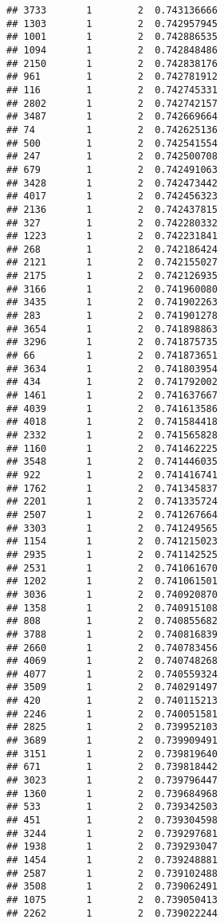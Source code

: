 \documentclass[
]{article}
\begin{document}
\begin{verbatim}
## 3733       1        2  0.743136666
## 1303       1        2  0.742957945
## 1001       1        2  0.742886535
## 1094       1        2  0.742848486
## 2150       1        2  0.742838176
## 961        1        2  0.742781912
## 116        1        2  0.742745331
## 2802       1        2  0.742742157
## 3487       1        2  0.742669664
## 74         1        2  0.742625136
## 500        1        2  0.742541554
## 247        1        2  0.742500708
## 679        1        2  0.742491063
## 3428       1        2  0.742473442
## 4017       1        2  0.742456323
## 2136       1        2  0.742437815
## 327        1        2  0.742280332
## 1223       1        2  0.742231841
## 268        1        2  0.742186424
## 2121       1        2  0.742155027
## 2175       1        2  0.742126935
## 3166       1        2  0.741960080
## 3435       1        2  0.741902263
## 283        1        2  0.741901278
## 3654       1        2  0.741898863
## 3296       1        2  0.741875735
## 66         1        2  0.741873651
## 3634       1        2  0.741803954
## 434        1        2  0.741792002
## 1461       1        2  0.741637667
## 4039       1        2  0.741613586
## 4018       1        2  0.741584418
## 2332       1        2  0.741565828
## 1160       1        2  0.741462225
## 3548       1        2  0.741446035
## 922        1        2  0.741416741
## 1762       1        2  0.741345837
## 2201       1        2  0.741335724
## 2507       1        2  0.741267664
## 3303       1        2  0.741249565
## 1154       1        2  0.741215023
## 2935       1        2  0.741142525
## 2531       1        2  0.741061670
## 1202       1        2  0.741061501
## 3036       1        2  0.740920870
## 1358       1        2  0.740915108
## 808        1        2  0.740855682
## 3788       1        2  0.740816839
## 2660       1        2  0.740783456
## 4069       1        2  0.740748268
## 4077       1        2  0.740559324
## 3509       1        2  0.740291497
## 420        1        2  0.740115213
## 2246       1        2  0.740051581
## 2825       1        2  0.739952103
## 3689       1        2  0.739909491
## 3151       1        2  0.739819640
## 671        1        2  0.739818442
## 3023       1        2  0.739796447
## 1360       1        2  0.739684968
## 533        1        2  0.739342503
## 451        1        2  0.739304598
## 3244       1        2  0.739297681
## 1938       1        2  0.739293047
## 1454       1        2  0.739248881
## 2587       1        2  0.739102488
## 3508       1        2  0.739062491
## 1075       1        2  0.739050413
## 2262       1        2  0.739022244

\end{verbatim}
\end{document}
